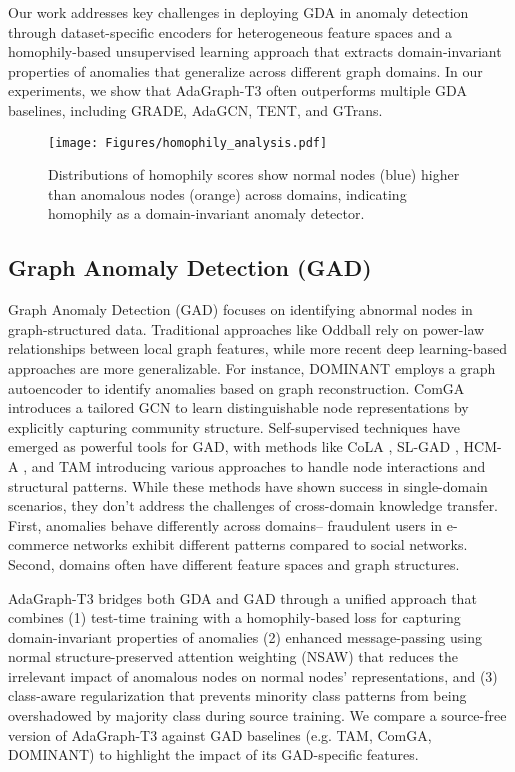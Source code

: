 Our work addresses key challenges in deploying GDA in anomaly detection through dataset-specific encoders for heterogeneous feature spaces and a homophily-based unsupervised learning approach that extracts domain-invariant properties of anomalies that generalize across different graph domains. In our experiments, we show that AdaGraph-T3 often outperforms multiple GDA baselines, including GRADE, AdaGCN, TENT, and GTrans.


\begin{figure}[t]
   \centering
   \texttt{[image: Figures/homophily\_analysis.pdf]}
   \caption{Distributions of homophily scores show normal nodes (blue) higher than anomalous nodes (orange) across domains, indicating homophily as a domain-invariant anomaly detector.}
   \label{fig:homophily}
\end{figure}
\subsection{Graph Anomaly Detection (GAD)}
Graph Anomaly Detection (GAD) \cite{ma2021comprehensive,akoglu2015graph} focuses on identifying abnormal nodes in graph-structured data. Traditional approaches like Oddball \cite{akoglu2010oddball} rely on power-law relationships between local graph features, while more recent deep learning-based approaches are more generalizable. For instance, DOMINANT \cite{ding2019deep} employs a graph autoencoder to identify anomalies based on graph reconstruction. ComGA \cite{luo2022comga} introduces a tailored GCN to learn distinguishable node representations by explicitly capturing community structure. Self-supervised techniques have emerged as powerful tools for GAD, with methods like CoLA \cite{liu2021anomaly}, SL-GAD \cite{zheng2021generative}, HCM-A \cite{huang2022hop}, and TAM \cite{qiao2024truncated} introducing various approaches to handle node interactions and structural patterns. While these methods have shown success in single-domain scenarios, they don't address the challenges of cross-domain knowledge transfer. First,
anomalies behave differently across domains-- fraudulent users in e-commerce networks exhibit different patterns compared to social networks. Second, domains often have different feature spaces and graph structures.


AdaGraph-T3 bridges both GDA and GAD through a unified approach that combines (1) test-time training with a homophily-based loss for capturing domain-invariant properties of anomalies
(2) enhanced message-passing using normal structure-preserved attention weighting (NSAW) that reduces the irrelevant impact of anomalous nodes on normal nodes' representations, and (3) class-aware regularization that prevents minority class patterns from being overshadowed by majority class during source training. We compare a source-free version of AdaGraph-T3 against GAD baselines (e.g. TAM, ComGA, DOMINANT) to highlight the impact of its GAD-specific features.